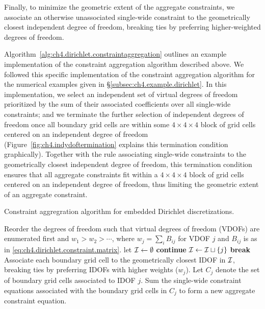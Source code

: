 Finally, to minimize the geometric extent of the aggregate constraints, we associate an otherwise unassociated single-wide constraint to the geometrically closest independent degree of freedom, breaking ties by preferring higher-weighted degrees of freedom.

Algorithm~\ref{alg:ch4.dirichlet.constraintaggregation} outlines an example implementation of the constraint aggregation algorithm described above. We followed this specific implementation of the constraint aggregation algorithm for the numerical examples given in \S\ref{subsec:ch4.example.dirichlet}. In this implementation, we select an independent set of virtual degrees of freedom prioritized by the sum of their associated coefficients over all single-wide constraints; and we terminate the further selection of independent degrees of freedom once all boundary grid cells are within some $4 \times 4 \times 4$ block of grid cells centered on an independent degree of freedom (Figure~\ref{fig:ch4.indydoftermination} explains this termination condition graphically). Together with the rule associating single-wide constraints to the geometrically closest independent degree of freedom, this termination condition ensures that all aggregate constraints fit within a $4 \times 4 \times 4$ block of grid cells centered on an independent degree of freedom, thus limiting the geometric extent of an aggregate constraint.

\begin{algorithm}[htbp]
\caption{Constraint aggregration algorithm for embedded Dirichlet discretizations.}
\label{alg:ch4.dirichlet.constraintaggregation}
\begin{algorithmic}[1]
\STATE Reorder the degrees of freedom such that virtual degrees of freedom (VDOFs) are enumerated first and $w_1 > w_2 > \dotsm$, where $w_j = \sum_i B_{ij}$ for VDOF $j$ and $B_{ij}$ is as in \eqref{eq:ch4.dirichlet.constraint.matrix}.
\STATE let $\mathcal{I} \leftarrow \emptyset$ 
\STATE {}
    \STATE {}
        \STATE \textbf{continue}
    \ENDIF
    \STATE $\mathcal{I} \leftarrow \mathcal{I} \sqcup \left\lbrace j \right\rbrace$ 
    \STATE {}
        \STATE \textbf{break}
    \ENDIF
\ENDFOR
\STATE Associate each boundary grid cell to the geometrically closest IDOF in $\mathcal{I}$, breaking ties by preferring IDOFs with higher weights ($w_j$). Let $C_j$ denote the set of boundary grid cells associated to IDOF $j$.
    \STATE Sum the single-wide constraint equations associated with the boundary grid cells in $C_j$ to form a new aggregate constraint equation.
\ENDFOR
\end{algorithmic}
\end{algorithm}

